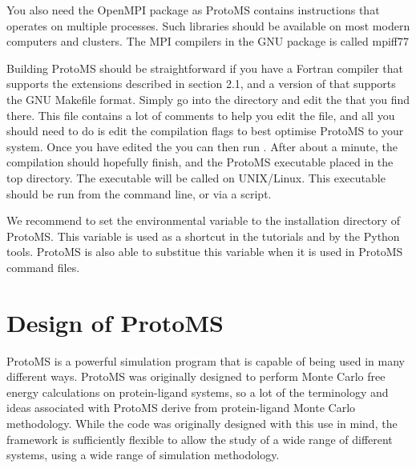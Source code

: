 \documentclass[letterpaper,10pt,english]{sphinxmanual}
\begin{document}
You also need the OpenMPI package as ProtoMS contains instructions that operates on multiple processes. Such libraries should be available on most modern computers and clusters. The MPI compilers in the GNU package is called mpiff77

Building ProtoMS should be straightforward if you have a Fortran compiler that supports the extensions described in section 2.1, and a version of  that supports the GNU Makefile format. Simply go into the  directory and edit the  that you find there. This file contains a lot of comments to help you edit the file, and all you should need to do is edit the compilation flags to best optimise ProtoMS to your system. Once you have edited the  you can then run . After about a minute, the compilation should hopefully finish, and the ProtoMS executable placed in the top directory. The executable will be called  on UNIX/Linux. This executable should be run from the command line, or via a script.

We recommend to set the environmental variable  to the installation directory of ProtoMS. This variable is used as a shortcut in the tutorials and by the Python tools. ProtoMS is also able to substitue this variable when it is used in ProtoMS command files.


\chapter{Design of ProtoMS}
\label{protoms:design-of-protoms}\label{protoms::doc}
ProtoMS is a powerful simulation program that is capable of being used in many different ways. ProtoMS was originally designed to perform Monte Carlo free energy calculations on protein-ligand systems, so a lot of the terminology and ideas associated with ProtoMS derive from protein-ligand Monte Carlo methodology. While the code was originally designed with this use in mind, the framework is sufficiently flexible to allow the study of a wide range of different systems, using a wide range of simulation methodology.
\end{document}
